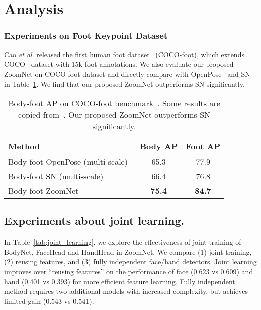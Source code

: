 \documentclass[runningheads]{llncs}
\newcommand{\etal}{\textit{et al}. }
\begin{document}
	
	
	\section{Analysis}
	
	\subsubsection{Experiments on Foot Keypoint Dataset}
	Cao \etal released the first human foot dataset~\cite{cao2018openpose} (COCO-foot), which extends COCO~\cite{lin2014microsoft} dataset with 15k foot annotations. We also evaluate our proposed ZoomNet on COCO-foot dataset and directly compare with OpenPose~\cite{cao2018openpose} and SN~\cite{hidalgo2019single} in Table~\ref{tab:coco_foot}. We find that our proposed ZoomNet outperforms SN significantly.
	
	\begin{table}[t]
		\caption{Body-foot AP on COCO-foot benchmark~\cite{cao2018openpose}. Some results are copied from~\cite{hidalgo2019single}. Our proposed ZoomNet outperforms SN significantly.}
		\begin{center}
			\begin{tabular}{l|c|c}
				\hline
				Method    & Body AP  &  Foot AP \\
				\hline
				Body-foot OpenPose (multi-scale)~\cite{cao2018openpose} &  65.3 & 77.9 \\
				Body-foot SN (multi-scale)~\cite{hidalgo2019single} &  66.4 & 76.8 \\
				Body-foot ZoomNet &  \textbf{75.4} & \textbf{84.7} \\
				\hline
			\end{tabular}
		\end{center}
		\label{tab:coco_foot}
	\end{table}
	
	\subsection{Experiments about joint learning.}
	
	In Table~\ref{tab:joint_learning}, we explore the effectiveness of joint training of BodyNet, FaceHead and HandHead in ZoomNet. We compare (1) joint training, (2) reusing features, and (3) fully independent face/hand detectors. Joint learning improves over ``reusing features'' on the performance of face (0.623 vs 0.609) and hand (0.401 vs 0.393) for more efficient feature learning. Fully independent method requires two additional models with increased complexity, but achieves limited gain (0.543 vs 0.541).
	
\end{document}
